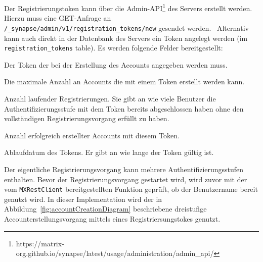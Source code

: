     Der Registrierungstoken kann über die Admin-API\footnote{https://matrix-org.github.io/synapse/latest/usage/administration/admin\_api/} des Servers erstellt werden.
    Hierzu muss eine GET-Anfrage an \texttt{/\_synapse/admin/v1/registration\_tokens/new} gesendet werden.~\cite{synapseregistartiontoken}
    Alternativ kann auch direkt in der Datenbank des Servers ein Token angelegt werden (im \texttt{registration\_tokens} table).
    Es werden folgende Felder bereitgestellt:
    \begin{description}[leftmargin=!,labelwidth=3cm]
        \item [token] Der Token der bei der Erstellung des Accounts angegeben werden muss.
        \item [uses\_allowed] Die maximale Anzahl an Accounts die mit einem Token erstellt werden kann.
        \item [pending] Anzahl laufender Registrierungen.
        Sie gibt an wie viele Benutzer die Authentifizierungsstufe mit dem Token bereits abgeschlossen haben ohne den vollständigen Registrierungsvorgang erfüllt zu haben.
        \item [completed] Anzahl erfolgreich erstellter Accounts mit diesem Token.
        \item [expiry\_time] Ablaufdatum des Tokens. Er gibt an wie lange der Token gültig ist.
    \end{description}

    Der eigentliche Registrierungsvorgang kann mehrere Authentifizierungsstufen enthalten.
    Bevor der Registrierungsvorgang gestartet wird, wird zuvor mit der vom \texttt{MXRestClient} bereitgestellten Funktion geprüft, ob der Benutzername bereit genutzt wird.
    In dieser Implementation wird der in Abbildung~\ref{fig:accountCreationDiagram} beschriebene dreistufige Accounterstellungsvorgang mittels eines Registriersungstokes genutzt.


